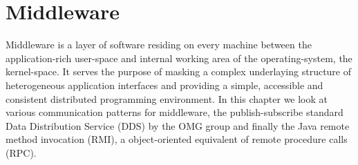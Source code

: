 \chapter{Middleware} \label{ch:middleware}

Middleware is a layer of software residing on every machine between the application-rich user-space and internal working area of the operating-system, the kernel-space. It serves the purpose of masking a complex underlaying structure of heterogeneous application interfaces and providing a simple, accessible and consistent distributed programming environment. In this chapter we look at various communication patterns for middleware, the publish-subscribe standard Data Distribution Service (DDS) by the OMG group and finally the Java remote method invocation (RMI), a object-oriented equivalent of remote procedure calls (RPC).



